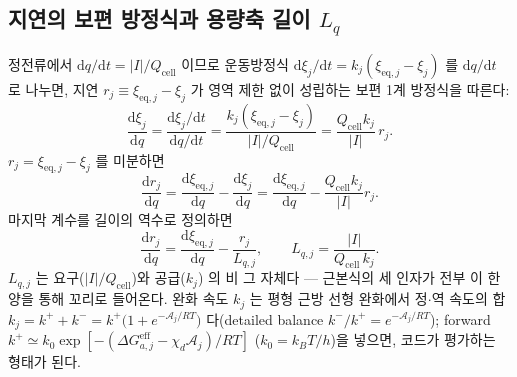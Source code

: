 \documentclass[11pt,a4paper]{article}
\newcommand{\dd}{\mathrm{d}}
\newcommand{\eff}{\mathrm{eff}}
\newcommand{\eq}{\mathrm{eq}}
\newcommand{\cell}{\mathrm{cell}}
\begin{document}
\subsection{지연의 보편 방정식과 용량축 길이 $L_q$}
정전류에서 $\dd q/\dd t=|I|/Q_\cell$ 이므로 운동방정식 $\dd\xi_j/\dd t=k_j(\xi_{\eq,j}-\xi_j)$ 를 $\dd q/\dd t$ 로
나누면, 지연 $r_j\equiv\xi_{\eq,j}-\xi_j$ 가 영역 제한 없이 성립하는 보편 1계 방정식을 따른다:
\begin{equation}
\frac{\dd\xi_j}{\dd q}
=\frac{\dd\xi_j/\dd t}{\dd q/\dd t}
=\frac{k_j(\xi_{\eq,j}-\xi_j)}{|I|/Q_\cell}
=\frac{Q_\cell k_j}{|I|}\,r_j.
\label{eq:LqderiveA}
\end{equation}
$r_j=\xi_{\eq,j}-\xi_j$ 를 미분하면
\begin{equation}
\frac{\dd r_j}{\dd q}
=\frac{\dd\xi_{\eq,j}}{\dd q}-\frac{\dd\xi_j}{\dd q}
=\frac{\dd\xi_{\eq,j}}{\dd q}-\frac{Q_\cell k_j}{|I|}r_j.
\label{eq:LqderiveB}
\end{equation}
마지막 계수를 길이의 역수로 정의하면
\begin{equation}
\frac{\dd r_j}{\dd q}=\frac{\dd\xi_{\eq,j}}{\dd q}-\frac{r_j}{L_{q,j}},
\qquad L_{q,j}=\frac{|I|}{Q_\cell\,k_j}.
\label{eq:Lq}
\end{equation}
$L_{q,j}$ 는 요구($|I|/Q_\cell$)와 공급($k_j$) 의 비 그 자체다 — 근본식의 세 인자가 전부 이 한 양을 통해 꼬리로
들어온다. 완화 속도 $k_j$ 는 평형 근방 선형 완화에서 정$\cdot$역 속도의 합 $k_j=k^++k^-=k^+\big(1+e^{-\mathcal A_j/RT}\big)$ 다(detailed balance $k^-/k^+=e^{-\mathcal A_j/RT}$); forward $k^+\simeq k_0\exp[-(\Delta G_{a,j}^\eff-\chi_d\mathcal A_j)/RT]$
($k_0=k_BT/h$)을 넣으면, 코드가 평가하는 형태가 된다.
\end{document}
